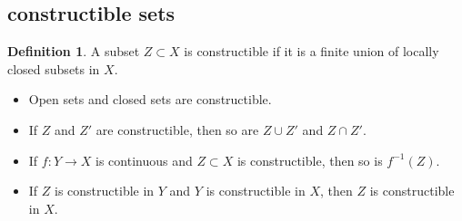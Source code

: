 \documentclass[leqno]{amsart}
\newcommand{\1}{\mathbf{1}}
\theoremstyle{definition}
\newtheorem{defn}[thm]{Definition}
\theoremstyle{remark}
\begin{document}
\subsection{constructible sets}

\begin{defn}
	A subset $Z\subset X$ is constructible 
	if it is a finite union of locally closed subsets in  $X$.
\end{defn}
\begin{itemize}
	\item Open sets and closed sets are constructible.
	\item If $Z$ and  $Z'$ are constructible,
		then so are  $Z\cup Z'$ and  $Z\cap Z'$.
	\item If  $f\colon Y\to X$ is continuous and  
		$Z\subset X$ is constructible, then so is $f^{-1}(Z)$.
	\item If  $Z$ is constructible in  $Y$ and 
		$Y$ is constructible in  $X$, 
		then $Z$ is constructible in  $X$.
\end{itemize}

\end{document}
